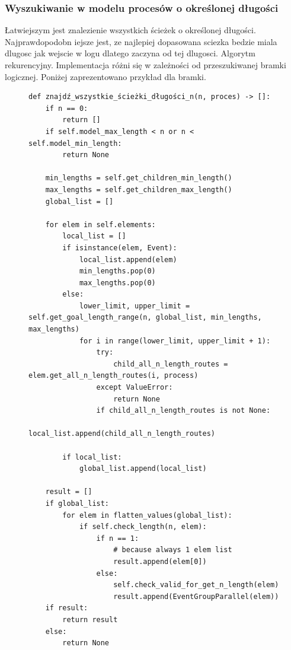 \clearpage
\subsubsection{Wyszukiwanie w modelu procesów o określonej długości}

Łatwiejszym jest znalezienie wszystkich ścieżek o określonej długości. Najprawdopodobn iejsze jest, ze najlepiej dopasowana sciezka bedzie miala dlugosc jak wejscie w logu dlatego zaczyna od tej dlugosci. 
Algorytm rekurencyjny. Implementacja różni się w zależności od przeszukiwanej bramki logicznej. Poniżej zaprezentowano przykład dla bramki.  
\begin{figure}[!ht]
\lstset{caption=Wyszukiwanie procesów o długości n, captionpos=b}
\lstset{label=src:get_n_length, frame=single}
\begin{lstlisting}
def znajdź_wszystkie_ścieżki_długości_n(n, proces) -> []:
    if n == 0:
        return []
    if self.model_max_length < n or n < self.model_min_length:
        return None

    min_lengths = self.get_children_min_length()
    max_lengths = self.get_children_max_length()
    global_list = []

    for elem in self.elements:
        local_list = []
        if isinstance(elem, Event):
            local_list.append(elem)
            min_lengths.pop(0)
            max_lengths.pop(0)
        else:
            lower_limit, upper_limit = self.get_goal_length_range(n, global_list, min_lengths, max_lengths)
            for i in range(lower_limit, upper_limit + 1):
                try:
                    child_all_n_length_routes = elem.get_all_n_length_routes(i, process)
                except ValueError:
                    return None
                if child_all_n_length_routes is not None:
                    local_list.append(child_all_n_length_routes)

        if local_list:
            global_list.append(local_list)

    result = []
    if global_list:
        for elem in flatten_values(global_list):
            if self.check_length(n, elem):
                if n == 1:
                    # because always 1 elem list
                    result.append(elem[0])
                else:
                    self.check_valid_for_get_n_length(elem)
                    result.append(EventGroupParallel(elem))
    if result:
        return result
    else:
        return None
\end{lstlisting}
\end{figure}

